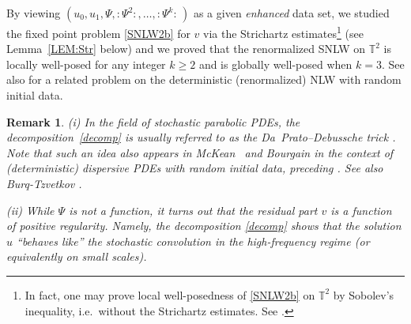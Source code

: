 \documentclass[%
11pt,  reqno]{amsart}
\newtheorem{remark}[theorem]{Remark}
\newcommand{\1}{\hspace{0.2mm}\text{I}\hspace{0.2mm}}
\newcommand{\noi}{\noindent}
\newcommand{\T}{\mathbb{T}}
\numberwithin{equation}{section}
\numberwithin{theorem}{section}
\begin{document}
\noi
By viewing 
$(u_0, u_1, \Psi, :\! \Psi^2  \!:, \dots, :\! \Psi^k  \!:\,)$
as a given {\it enhanced} data set, 
we studied the fixed point problem \eqref{SNLW2b} 
for $v$  via the Strichartz estimates\footnote{In fact, one may prove local well-posedness
of \eqref{SNLW2b} on $\T^2$ by Sobolev's inequality, i.e.~without  the Strichartz estimates.
See \cite{GKOT}.}
(see Lemma~\ref{LEM:Str} below) and  we proved that the renormalized SNLW on $\T^2$ is locally well-posed
for any integer  $k \geq 2$ and is globally well-posed when $k = 3$.
See also \cite{OT2, OOTz} for a related problem
on the deterministic (renormalized) NLW with random initial data.

\begin{remark}\label{REM:behavior1}\rm 
(i) 
In the field of stochastic parabolic  PDEs, 
the decomposition~\eqref{decomp} is usually referred to as the Da~Prato--Debussche trick \cite{DPD, DPD2}.
Note that such an idea also appears in 
McKean~\cite{McKean} and 
Bourgain \cite{BO96} in the context of (deterministic) dispersive PDEs with random initial data, preceding \cite{DPD}. See also Burq-Tzvetkov \cite{BT1}.


\smallskip

\noi
(ii) While $\Psi$ is not a function, it turns out that the residual part $v$ is a function 
of positive regularity.
Namely, the decomposition \eqref{decomp} shows that 
the solution $u$  ``behaves like'' the stochastic convolution
in the high-frequency regime (or equivalently on small scales).
\end{remark}
\end{document}
